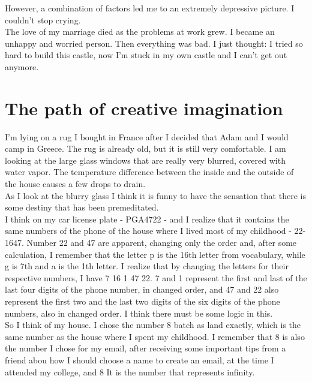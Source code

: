 \documentclass[11pt]{book}
\begin{document}
\noindent However, a combination of factors led me to an extremely depressive picture. I couldn't stop crying. \\

\noindent The love of my marriage died as the problems at work grew. I became an unhappy and worried person. Then everything was bad. I just thought: I tried so hard to build this castle, now I'm stuck in my own castle and I can't get out anymore. \\

\chapter{The path of creative imagination}

\noindent I'm lying on a rug I bought in France after I decided that Adam and I would camp in Greece. The rug is already old, but it is still very comfortable. I am looking at the large glass windows that are really very blurred, covered with water vapor. The temperature difference between the inside and the outside of the house causes a few drops to drain. \\

\noindent As I look at the blurry glass I think it is funny to have the sensation that there is some destiny that has been premeditated. \\

\noindent I think on my car license plate - PGA4722 - and I realize that it contains the same numbers of the phone of the house where I lived most of my childhood - 22-1647. Number 22 and 47 are apparent, changing only the order and, after some calculation, I remember that the letter p is the 16th letter from vocabulary, while g is 7th and a is the 1th letter. I realize that by changing the letters for their respective numbers, I have 7 16 1 47 22. 7 and 1 represent the first and last of the last four digits of the phone number, in changed order, and 47 and 22 also represent the first two and the last two digits of the six digits of the phone numbers, also in changed order. I think there must be some logic in this. \\

\noindent So I think of my house. I chose the number 8 batch as land exactly, which is the same number as the house where I spent my childhood. I remember that 8 is also the number I chose for my email, after receiving some important tips from a friend abou how I should choose a name to create an email, at the time I attended my college, and 8 It is the number that represents infinity. \\
\end{document}
